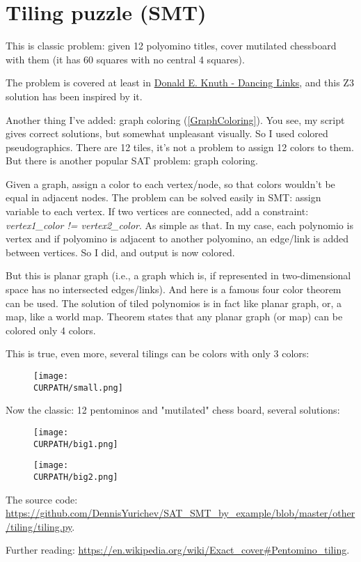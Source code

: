 \section{Tiling puzzle (SMT)}
\label{tiling_Z3}

\renewcommand{\CURPATH}{other/tiling}

This is classic problem: given 12 polyomino titles, cover mutilated chessboard with them (it has 60 squares with no central 4 squares).

The problem is covered at least in \href{https://arxiv.org/pdf/cs/0011047.pdf}{Donald E. Knuth - Dancing Links},
and this Z3 solution has been inspired by it.

Another thing I've added: graph coloring (\ref{GraphColoring}). You see, my script gives correct solutions, but somewhat unpleasant visually.
So I used colored pseudographics. There are 12 tiles, it's not a problem to assign 12 colors to them.
But there is another popular SAT problem: graph coloring.

Given a graph, assign a color to each vertex/node, so that colors wouldn't be equal in adjacent nodes.
The problem can be solved easily in SMT: assign variable to each vertex.
If two vertices are connected, add a constraint: \textit{vertex1\_color != vertex2\_color}.
As simple as that.
In my case, each polynomio is vertex and if polyomino is adjacent to another polyomino, an edge/link is added between vertices.
So I did, and output is now colored.

But this is planar graph (i.e., a graph which is, if represented in two-dimensional space has no intersected edges/links).
And here is a famous four color theorem can be used.
The solution of tiled polynomios is in fact like planar graph, or, a map, like a world map.
Theorem states that any planar graph (or map) can be colored only 4 colors.

This is true, even more, several tilings can be colors with only 3 colors:

\begin{figure}[H]
\centering
\texttt{[image: \\CURPATH/small.png]}
\caption{}
\end{figure}

Now the classic: 12 pentominos and "mutilated" chess board, several solutions:

\begin{figure}[H]
\centering
\texttt{[image: \\CURPATH/big1.png]}
\caption{}
\end{figure}

\begin{figure}[H]
\centering
\texttt{[image: \\CURPATH/big2.png]}
\caption{}
\end{figure}

The source code: \url{https://github.com/DennisYurichev/SAT_SMT_by_example/blob/master/other/tiling/tiling.py}.

Further reading: \url{https://en.wikipedia.org/wiki/Exact_cover#Pentomino_tiling}.

